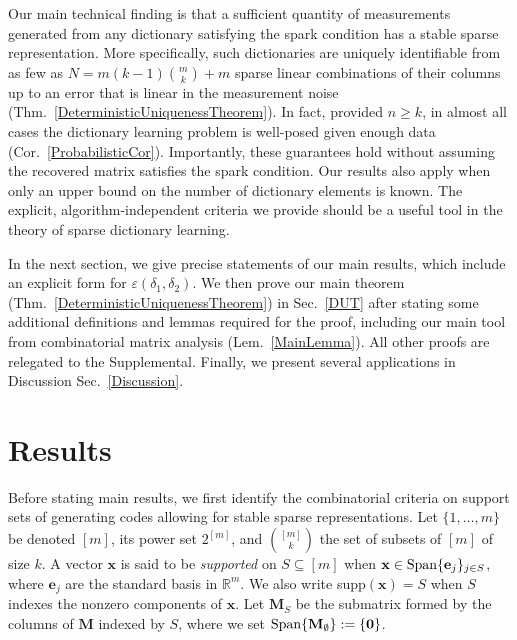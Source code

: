 \documentclass[9pt,twocolumn]{pnas-new}
\begin{document}
Our main technical finding is that a sufficient quantity of measurements generated from any dictionary satisfying the spark condition 
has a stable sparse representation.  More specifically, such dictionaries are uniquely identifiable from as few as \mbox{$N = m(k-1){m \choose k} + m$} sparse linear combinations of their columns up to an error that is linear in the measurement noise (Thm.~\ref{DeterministicUniquenessTheorem}). In fact, provided $n \geq k$, %
in almost all cases the dictionary learning problem is well-posed given enough data (Cor.~\ref{ProbabilisticCor}). Importantly, these guarantees hold without assuming the recovered matrix satisfies the spark condition. Our results  also apply when only an upper bound on the number of dictionary elements is known. The explicit, algorithm-independent criteria we provide should be a useful tool in the theory of sparse dictionary learning.  

In the next section, we give precise statements of our main results, which include an explicit form for $\varepsilon(\delta_1, \delta_2)$. We then prove our main theorem (Thm.~\ref{DeterministicUniquenessTheorem}) in Sec.~\ref{DUT} after stating some additional definitions and lemmas required for the proof, including our main tool from combinatorial matrix analysis (Lem.~\ref{MainLemma}). All other proofs are relegated to the Supplemental. 
Finally, we present several applications in Discussion Sec.~\ref{Discussion}.

\section{Results}

Before stating main results, we first identify the combinatorial criteria on support sets of generating codes allowing for stable sparse 
representations.  Let $\{1, \ldots, m\}$ be denoted $[m]$, its power set $2^{[m]}$, and ${[m] \choose k}$ the set of subsets of $[m]$ of size $k$. 
A vector $\mathbf{x}$ is said to be \emph{supported} on $S \subseteq [m]$ %
when $\mathbf{x} \in \text{\rm Span} \{\mathbf{e}_j\}_{j\in S}$, where $\mathbf{e}_j$ are the standard basis in $\mathbb R^m$.  We also write
 supp$(\mathbf{x}) = S$ when $S$ indexes the nonzero components of $\mathbf{x}$.
Let $\mathbf{M}_S$ be the submatrix formed by the columns of $\mathbf{M}$ indexed by $S$, where we set $\text{\rm Span}\{\mathbf{M}_\emptyset\} := \{\textbf{0}\}$.
\end{document}
